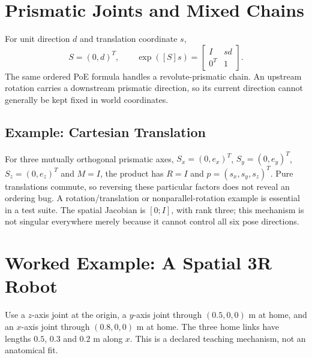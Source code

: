 \section{Prismatic Joints and Mixed Chains}
\label{sec:prismatic_joints}

For unit direction $d$ and translation coordinate $s$,
\begin{equation}
 S=(0,d)^T,\qquad
 \exp([S]s)=\begin{bmatrix}I&sd\\0^T&1\end{bmatrix}.
\end{equation}
The same ordered PoE formula handles a revolute-prismatic chain. An upstream rotation carries a downstream prismatic direction, so its current direction cannot generally be kept fixed in world coordinates.

\subsection{Example: Cartesian Translation}
\label{subsec:cartesian_example}

For three mutually orthogonal prismatic axes, $S_x=(0,e_x)^T$, $S_y=(0,e_y)^T$, $S_z=(0,e_z)^T$ and $M=I$, the product has $R=I$ and $p=(s_x,s_y,s_z)^T$. Pure translations commute, so reversing these particular factors does not reveal an ordering bug. A rotation/translation or nonparallel-rotation example is essential in a test suite. The spatial Jacobian is $[0;I]$, with rank three; this mechanism is not singular everywhere merely because it cannot control all six pose directions.

\section{Worked Example: A Spatial 3R Robot}
\label{sec:worked_example_3r}

Use a $z$-axis joint at the origin, a $y$-axis joint through $(0.5,0,0)$ m at home, and an $x$-axis joint through $(0.8,0,0)$ m at home. The three home links have lengths $0.5$, $0.3$ and $0.2$ m along $x$. This is a declared teaching mechanism, not an anatomical fit.

